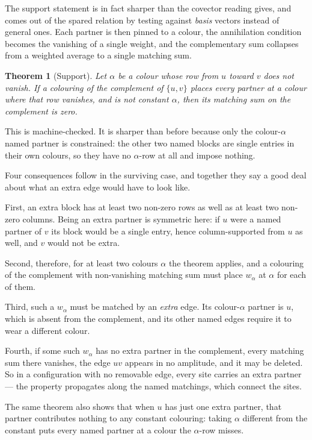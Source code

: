 \documentclass[11pt]{article}
\newtheorem{theorem}{Theorem}[section]
\theoremstyle{definition}
\theoremstyle{remark}
\begin{document}
The support statement is in fact sharper than the covector reading gives, and comes out
of the spared relation by testing against \emph{basis} vectors instead of general ones.
Each partner is then pinned to a colour, the annihilation condition becomes the vanishing
of a single weight, and the complementary sum collapses from a weighted average to a
single matching sum.

\begin{theorem}[Support]\label{thm:support}
Let $\alpha$ be a colour whose row from $u$ toward $v$ does not vanish. If a colouring of
the complement of $\{u,v\}$ places every partner at a colour where that row vanishes, and
is not constant $\alpha$, then its matching sum on the complement is zero.
\end{theorem}

This is machine-checked. It is sharper than before because only the colour-$\alpha$ named
partner is constrained: the other two named blocks are single entries in their own
colours, so they have no $\alpha$-row at all and impose nothing.

Four consequences follow in the surviving case, and together they say a good deal about
what an extra edge would have to look like.

First, an extra block has at least two non-zero rows as well as at least two non-zero
columns. Being an extra partner is symmetric here: if $u$ were a named partner of $v$ its
block would be a single entry, hence column-supported from $u$ as well, and $v$ would not
be extra.

Second, therefore, for at least two colours $\alpha$ the theorem applies, and a colouring
of the complement with non-vanishing matching sum must place $w_\alpha$ at $\alpha$ for
each of them.

Third, such a $w_\alpha$ must be matched by an \emph{extra} edge. Its colour-$\alpha$
partner is $u$, which is absent from the complement, and its other named edges require it
to wear a different colour.

Fourth, if some such $w_\alpha$ has no extra partner in the complement, every matching sum
there vanishes, the edge $uv$ appears in no amplitude, and it may be deleted. So in a
configuration with no removable edge, every site carries an extra partner --- the property
propagates along the named matchings, which connect the sites.

The same theorem also shows that when $u$ has just one extra partner, that partner
contributes nothing to any constant colouring: taking $\alpha$ different from the constant
puts every named partner at a colour the $\alpha$-row misses.
\end{document}
